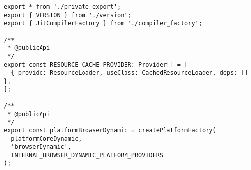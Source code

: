 \begin{verbatim}
export * from './private_export';
export { VERSION } from './version';
export { JitCompilerFactory } from './compiler_factory';

/**
 * @publicApi
 */
export const RESOURCE_CACHE_PROVIDER: Provider[] = [
  { provide: ResourceLoader, useClass: CachedResourceLoader, deps: [] },
];

/**
 * @publicApi
 */
export const platformBrowserDynamic = createPlatformFactory(
  platformCoreDynamic,
  'browserDynamic',
  INTERNAL_BROWSER_DYNAMIC_PLATFORM_PROVIDERS
);
\end{verbatim}
